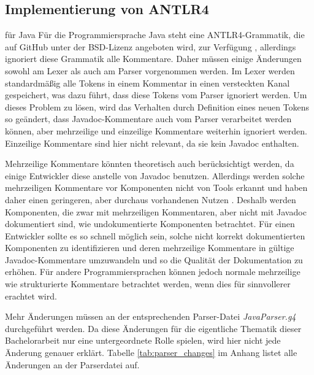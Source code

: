 \subsection{Implementierung von ANTLR4} für Java\label{chapter:antlr4_impl}
Für die Programmiersprache Java steht eine ANTLR4-Grammatik, die auf GitHub unter der BSD-Lizenz angeboten wird, zur Verfügung \cite{ANTLRgrammarforjava}, allerdings ignoriert diese Grammatik alle Kommentare. Daher müssen einige Änderungen sowohl am Lexer als auch am Parser vorgenommen werden. Im Lexer werden standardmäßig alle Tokens in einem Kommentar in einen versteckten Kanal gespeichert, was dazu führt, dass diese Tokens vom Parser ignoriert werden. Um dieses Problem zu lösen, wird das Verhalten durch Definition eines neuen Tokens so geändert, dass Javadoc-Kommentare auch vom Parser verarbeitet werden können, aber mehrzeilige und einzeilige Kommentare weiterhin ignoriert werden. Einzeilige Kommentare sind hier nicht relevant, da sie kein Javadoc enthalten.

Mehrzeilige Kommentare könnten theoretisch auch berücksichtigt werden, da einige Entwickler diese anstelle von Javadoc benutzen. Allerdings werden solche mehrzeiligen Kommentare vor Komponenten nicht von Tools erkannt und haben daher einen geringeren, aber durchaus vorhandenen Nutzen \cite[S.~4]{HowDocumentationEvolvesoverTime}. Deshalb werden Komponenten, die zwar mit mehrzeiligen Kommentaren, aber nicht mit Javadoc dokumentiert sind, wie undokumentierte Komponenten betrachtet. Für einen Entwickler sollte es so schnell möglich sein, solche nicht korrekt dokumentierten Komponenten zu identifizieren und deren mehrzeilige Kommentare in gültige Javadoc-Kommentare umzuwandeln und so die Qualität der Dokumentation zu erhöhen. Für andere Programmiersprachen können jedoch normale mehrzeilige wie strukturierte Kommentare betrachtet werden, wenn dies für sinnvollerer erachtet wird.

Mehr Änderungen müssen an der entsprechenden Parser-Datei \textit{JavaParser.g4} durchgeführt werden.  Da diese Änderungen für die eigentliche Thematik dieser Bachelorarbeit nur eine untergeordnete Rolle spielen, wird hier nicht jede Änderung genauer erklärt. Tabelle \ref{tab:parser_changes} im Anhang listet alle Änderungen an der Parserdatei auf.

